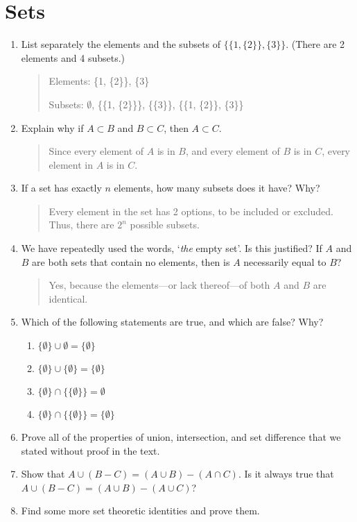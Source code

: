 \documentclass{article}
\newenvironment{answer}{
\begin{quote}}{
\end{quote}}
\begin{document}
\appendix
\section{Sets}

\begin{enumerate}
  \item List separately the elements and the subsets of $\{\{1,
    \{2\}\}, \{3\}\}$. (There are 2 elements and 4 subsets.)
    \begin{answer}
      Elements: \{1, \{2\}\}, \{3\}

      Subsets: $\emptyset$, \{\{1, \{2\}\}\}, \{\{3\}\}, \{\{1, \{2\}\}, \{3\}\}
    \end{answer}

  \item Explain why if $A \subset B$ and $B \subset C$, then $A \subset C$.
  \begin{answer}
    Since every element of $A$ is in $B$, and every element of $B$ is in $C$, every element in $A$ is in $C$.    
  \end{answer}

  \item If a set has exactly $n$ elements, how many subsets does it have? Why?
  \begin{answer}
    Every element in the set has 2 options, to be included or excluded. Thus, there are $2^n$ possible subsets.
  \end{answer}

  \item We have repeatedly used the words, `\textit{the} empty set'. Is this
    justified? If $A$ and $B$ are both sets that contain no elements,
    then is $A$ necessarily equal to $B$?
  \begin{answer}
    Yes, because the elements---or lack thereof---of both $A$ and $B$ are identical.
  \end{answer}

  \item Which of the following statements are true, and which are false? Why?
    \begin{enumerate}
      \item $\{\emptyset\} \cup \emptyset = \{\emptyset\}$
      \item $\{\emptyset\} \cup \{\emptyset\} = \{\emptyset\}$
      \item $\{\emptyset\} \cap \{\{\emptyset\}\} = \emptyset$
      \item $\{\emptyset\} \cap \{\{\emptyset\}\} = \{\emptyset\}$
    \end{enumerate}

  \item Prove all of the properties of union, intersection, and set
    difference that we stated without proof in the text.

  \item Show that $A \cup (B-C) = (A \cup B)-(A \cap C)$. Is it
    always true that $A \cup (B-C) = (A \cup B) - (A \cup C)$?

  \item Find some more set theoretic identities and prove them.
\end{enumerate}
\end{document}
